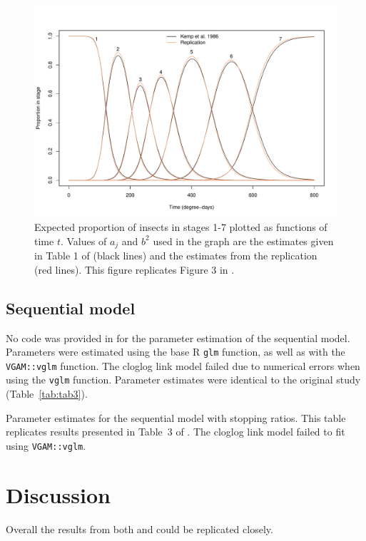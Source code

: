 \begin{figure}
  \centering
  \includegraphics[width=\textwidth]{../figures/dennis_fig3.pdf}
  \caption{Expected proportion of insects in stages 1-7 plotted as functions of time $t$.
   Values of $a_j$ and $b^2$ used in the graph are the estimates given in Table 1 of \citep{kemp1986stochastic} (black lines) and the estimates from the replication (red lines). 
   This figure replicates Figure 3 in \citep{dennis1986stochastic}.}
  \label{fig:fig2}
\end{figure}

\subsection{Sequential model}
No code was provided in \citep{candy1991modeling} for the parameter estimation of the sequential model. 
Parameters were estimated using the base R \verb+glm+ function, as well as with the  \verb+VGAM::vglm+ function. 
The cloglog link model failed due to numerical errors when using the \verb+vglm+ function. 
Parameter estimates were identical to the original study (Table~\ref{tab:tab3}).

\begin{table}
  \small
    \centering
    \caption{Parameter estimates for the sequential model with stopping ratios. 
    This table replicates results presented in Table~3 of \citep{candy1991modeling}. 
    The cloglog link model failed to fit using \texttt{VGAM::vglm}.}
  
  \label{tab:tab3}
\end{table}

\section{Discussion}
Overall the results from both \citep{dennis1986stochastic} and \citep{candy1991modeling} could be replicated closely.

